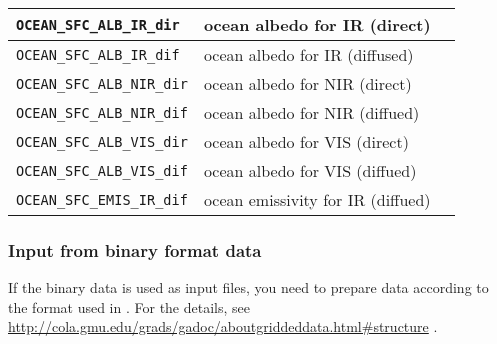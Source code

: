 {\begin{table}[tbh]
\begin{center}
\begin{tabularx}{150mm}{llX}
\verb|OCEAN_SFC_ALB_IR_dir|  & ocean albedo for IR (direct)   & \\ \hline
\verb|OCEAN_SFC_ALB_IR_dif|  & ocean albedo for IR (diffused) & \\ \hline
\verb|OCEAN_SFC_ALB_NIR_dir| & ocean albedo for NIR (direct)  & \\ \hline
\verb|OCEAN_SFC_ALB_NIR_dif| & ocean albedo for NIR (diffued) & \\ \hline
\verb|OCEAN_SFC_ALB_VIS_dir| & ocean albedo for VIS (direct)  & \\ \hline
\verb|OCEAN_SFC_ALB_VIS_dif| & ocean albedo for VIS (diffued) & \\ \hline
\verb|OCEAN_SFC_EMIS_IR_dif| & ocean emissivity for IR (diffued) & \\ \hline
\end{tabularx}
\end{center}
\end{table}
}



\subsubsection{Input from binary format data} \label{sec:datainput_grads}

If the binary data is used as input files,
you need to prepare data according to the format used in \grads.
For the details, see \url{http://cola.gmu.edu/grads/gadoc/aboutgriddeddata.html#structure} .

